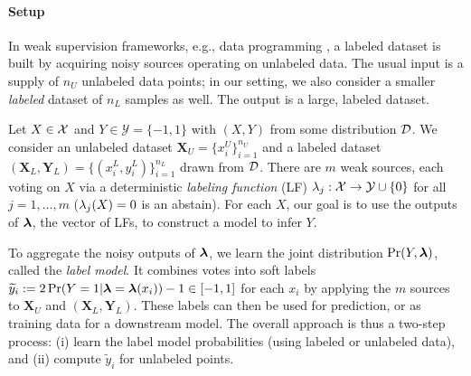 \paragraph{Setup} In weak supervision frameworks, e.g., data programming \citep{Ratner16}, a labeled dataset is built by acquiring noisy sources operating on unlabeled data. %
The usual input is a supply of $n_U$ unlabeled data points; in our setting, we also consider a smaller \emph{labeled} dataset of $n_L$ samples as well. The output is a large, labeled dataset.

Let $X \in \mathcal{X}$ and $Y \in \mathcal{Y} = \{-1, 1\}$ with $(X, Y)$ from some distribution $\mathcal{D}$. We consider an unlabeled dataset $\bm{X}_U = \{x_i^U\}_{i = 1}^{n_U}$ and a labeled dataset $(\bm{X}_L, \bm{Y}_L) = \{(x_i^L, y_i^L) \}_{i = 1}^{n_L}$ drawn from $\mathcal{D}$.
There are $m$ weak sources, each
voting on $X$ via a deterministic \textit{labeling function} (LF)
$\lambda_j: \mathcal{X} \rightarrow \mathcal{Y} \cup \{0\}$ for all
$j = 1, \dots, m$ ($\lambda_j(X) = 0$ is an abstain). 
For each $X$, our goal is to use the outputs of $\bm{\lambda}$, the vector of LFs, to construct a model to infer $Y$.

To aggregate the noisy outputs of $\bm{\lambda}$, we learn the joint distribution $\Pr(Y, \bm{\lambda})$, called the \textit{label model}. It combines votes into soft labels $\widetilde{y}_i := 2 \Pr(Y = 1 | \bm{\lambda} = \bm{\lambda}(x_i)) - 1 \in [-1, 1]$ for each $x_i$ by applying
the $m$ sources to $\bm{X}_U$ and $(\bm{X}_L, \bm{Y}_L)$. These labels can then be used for prediction, or as training data for a downstream model. The overall approach is thus a two-step process: (i) learn the label model probabilities (using labeled or unlabeled data), and (ii) compute $\tilde{y}_i$ for unlabeled points.



